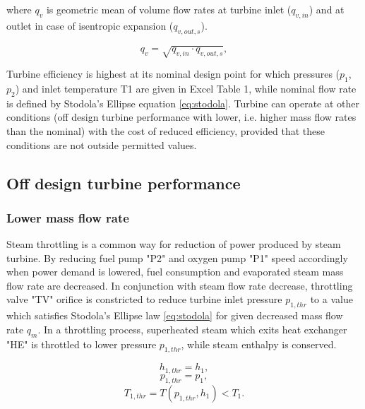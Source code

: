 \documentclass{article}
\begin{document}
	\noindent
	where $q_v$ is geometric mean of volume flow rates at turbine inlet ($q_{v,in}$) and at outlet in case of isentropic expansion ($q_{v,out,s}$). 
	
	\begin{equation}\label{eq:q_v}
		q_v = \sqrt{q_{v,in} \cdot q_{v,out,s}},
	\end{equation}
	
	Turbine efficiency is highest at its nominal design point for which 
	pressures ($p_1$, $p_2$) and inlet temperature T1 are given in Excel Table 
	1, while nominal flow rate is defined by Stodola’s Ellipse equation 
	\ref{eq:stodola}. Turbine can operate at other conditions (off design 
	turbine performance with lower, i.e. higher mass flow rates than the 
	nominal) with the cost of reduced efficiency, provided that these 
	conditions are not outside permitted values.
	
	\subsection{Off design turbine performance}
	
	\subsubsection*{Lower mass flow rate}
	
	Steam throttling is a common way for reduction of power produced by steam 
	turbine. By reducing fuel pump "P2" and oxygen pump "P1" speed accordingly 
	when power demand is lowered, fuel consumption and evaporated steam mass 
	flow rate are decreased. In conjunction with steam flow rate decrease, 
	throttling valve "TV" orifice is constricted to reduce turbine inlet 
	pressure $p_{1,thr}$ to a value which satisfies Stodola’s Ellipse law 
	\ref{eq:stodola} for given decreased mass flow rate $q_m$. In a throttling 
	process, superheated steam which exits heat exchanger "HE" is throttled to 
	lower pressure $p_{1,thr}$, while steam enthalpy is conserved.
	
	\begin{equation}\label{eq:ent_preserve1}
		h_{1,thr} = h_1,
	\end{equation}
	\begin{equation}\label{eq:ent_preserve2}
	p_{1,thr} = p_1,
	\end{equation}
	\begin{equation}\label{eq:ent_preserve3}
	T_{1,thr} = T(p_{1,thr},h_1) < T_1.
	\end{equation}
	
\end{document}
